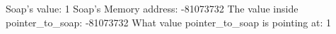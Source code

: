 Soap's value: 1
Soap's Memory address: -81073732
The value inside pointer_to_soap: -81073732
What value pointer_to_soap is pointing at: 1
